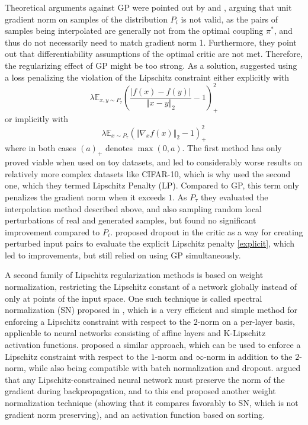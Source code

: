 \documentclass{article}
\begin{document}
Theoretical arguments against GP were pointed out by \citet{Petzkaetal2018} and \citet{Gemicietal2018}, arguing that unit gradient norm on samples of the distribution $P_i$ is not valid, as the pairs of samples being interpolated are generally not from the optimal coupling $\pi^\ast$, and thus do not necessarily need to match gradient norm 1. Furthermore, they point out that differentiability assumptions of the optimal critic are not met. Therefore, the regularizing effect of GP might be too strong. As a solution, \citet{Petzkaetal2018} suggested using a loss penalizing the violation of the Lipschitz constraint either explicitly with
\begin{equation} \label{explicit}
\lambda\mathbb{E}_{x,y\sim P_{\tau}}\left(\frac{\lvert f(x)-f(y)\rvert}{\Vert x-y\Vert_2}-1\right)_+^2
\end{equation}
or implicitly with
\begin{equation} \label{implicit}
\lambda\mathbb{E}_{x\sim P_{\tau}}\left(\Vert\nabla_xf(x)\Vert_2-1\right)_+^2
\end{equation}
where in both cases $(a)_+$ denotes $\max(0,a)$. The first method has only proved viable when used on toy datasets, and led to considerably worse results on relatively more complex datasets like CIFAR-10, which is why \citet{Petzkaetal2018} used the second one, which they termed Lipschitz Penalty (LP). Compared to GP, this term only penalizes the gradient norm when it exceeds $1$. As $P_{\tau}$ they evaluated the interpolation method described above, and also sampling random local perturbations of real and generated samples, but found no significant improvement compared to $P_i$. \citet{Weietal2018} proposed dropout in the critic as a way for creating perturbed input pairs to evaluate the explicit Lipschitz penalty \eqref{explicit}, which led to improvements, but still relied on using GP simultaneously.

A second family of Lipschitz regularization methods is based on weight normalization, restricting the Lipschitz constant of a network globally instead of only at points of the input space. One such technique is called spectral normalization (SN) proposed in \citet{Miyatoetal2018}, which is a very efficient and simple method for enforcing a Lipschitz constraint with respect to the $2$-norm on a per-layer basis, applicable to neural networks consisting of affine layers and K-Lipschitz activation functions. \citet{Gouketal2018} proposed a similar approach, which can be used to enforce a Lipschitz constraint with respect to the $1$-norm and $\infty$-norm in addition to the $2$-norm, while also being compatible with batch normalization and dropout. \citet{Aniletal2018} argued that any Lipschitz-constrained neural network must preserve the norm of the gradient during backpropagation, and to this end proposed another weight normalization technique (showing that it compares favorably to SN, which is not gradient norm preserving), and an activation function based on sorting.
\end{document}

